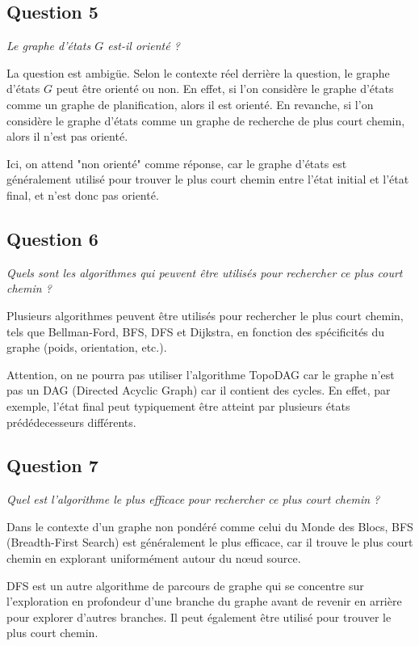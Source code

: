 \subsection{Question 5}

\textit{Le graphe d'états $G$ est-il orienté ?}

La question est ambigüe. Selon le contexte réel derrière la question, le graphe d'états $G$ peut être orienté ou non. En effet, si l'on considère le graphe d'états comme un graphe de planification, alors il est orienté. En revanche, si l'on considère le graphe d'états comme un graphe de recherche de plus court chemin, alors il n'est pas orienté.

Ici, on attend "non orienté" comme réponse, car le graphe d'états est généralement utilisé pour trouver le plus court chemin entre l'état initial et l'état final, et n'est donc pas orienté.

\subsection{Question 6}

\textit{Quels sont les algorithmes qui peuvent être utilisés pour rechercher ce plus court chemin ?}

Plusieurs algorithmes peuvent être utilisés pour rechercher le plus court chemin, tels que Bellman-Ford, BFS, DFS et Dijkstra, en fonction des spécificités du graphe (poids, orientation, etc.).

Attention, on ne pourra pas utiliser l'algorithme TopoDAG car le graphe n'est pas un DAG (Directed Acyclic Graph) car il contient des cycles. En effet, par exemple, l'état final peut typiquement être atteint par plusieurs états prédédecesseurs différents.

\subsection{Question 7}

\textit{Quel est l'algorithme le plus efficace pour rechercher ce plus court chemin ?}

Dans le contexte d'un graphe non pondéré comme celui du Monde des Blocs, BFS (Breadth-First Search) est généralement le plus efficace, car il trouve le plus court chemin en explorant uniformément autour du nœud source.

DFS est un autre algorithme de parcours de graphe qui se concentre sur l'exploration en profondeur d'une branche du graphe avant de revenir en arrière pour explorer d'autres branches. Il peut également être utilisé pour trouver le plus court chemin. 

